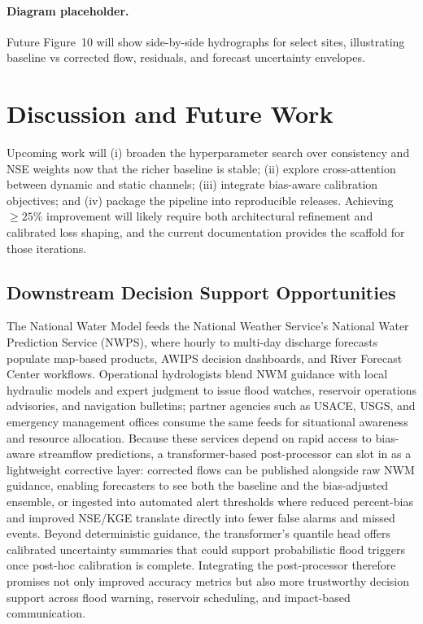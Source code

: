 \documentclass[draft]{agujournal2019}
\begin{document}
\paragraph{Diagram placeholder.} Future Figure~10 will show side-by-side hydrographs for select sites, illustrating baseline vs corrected flow, residuals, and forecast uncertainty envelopes.

\section{Discussion and Future Work}
Upcoming work will (i) broaden the hyperparameter search over consistency and NSE weights now that the richer baseline is stable; (ii) explore cross-attention between dynamic and static channels; (iii) integrate bias-aware calibration objectives; and (iv) package the pipeline into reproducible releases. Achieving \(\geq 25\%\) improvement will likely require both architectural refinement and calibrated loss shaping, and the current documentation provides the scaffold for those iterations.

\subsection{Downstream Decision Support Opportunities}
The National Water Model feeds the National Weather Service’s National Water Prediction Service (NWPS), where hourly to multi-day discharge forecasts populate map-based products, AWIPS decision dashboards, and River Forecast Center workflows. Operational hydrologists blend NWM guidance with local hydraulic models and expert judgment to issue flood watches, reservoir operations advisories, and navigation bulletins; partner agencies such as USACE, USGS, and emergency management offices consume the same feeds for situational awareness and resource allocation. Because these services depend on rapid access to bias-aware streamflow predictions, a transformer-based post-processor can slot in as a lightweight corrective layer: corrected flows can be published alongside raw NWM guidance, enabling forecasters to see both the baseline and the bias-adjusted ensemble, or ingested into automated alert thresholds where reduced percent-bias and improved NSE/KGE translate directly into fewer false alarms and missed events. Beyond deterministic guidance, the transformer’s quantile head offers calibrated uncertainty summaries that could support probabilistic flood triggers once post-hoc calibration is complete. Integrating the post-processor therefore promises not only improved accuracy metrics but also more trustworthy decision support across flood warning, reservoir scheduling, and impact-based communication.
\end{document}
